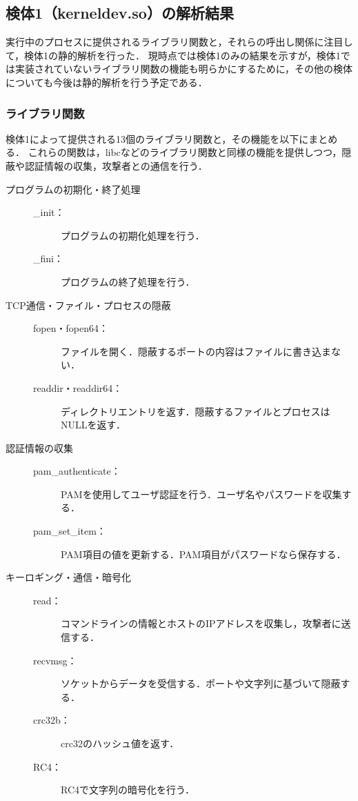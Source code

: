 \documentclass[submit,techreq,noauthor]{eco}	%
\begin{document}
\subsection{検体1（kerneldev.so）の解析結果}
実行中のプロセスに提供されるライブラリ関数と，それらの呼出し関係に注目して，検体1の静的解析を行った．
現時点では検体1のみの結果を示すが，検体1では実装されていないライブラリ関数の機能も明らかにするために，その他の検体についても今後は静的解析を行う予定である．\\
\subsubsection{ライブラリ関数}
検体1によって提供される13個のライブラリ関数と，その機能を以下にまとめる．
これらの関数は，libcなどのライブラリ関数と同様の機能を提供しつつ，隠蔽や認証情報の収集，攻撃者との通信を行う．
\begin{description}

  \item [プログラムの初期化・終了処理] \mbox{}
  \begin{description}
    \item[\_init：] プログラムの初期化処理を行う．
    \item[\_fini：]プログラムの終了処理を行う．
  \end{description}

  \item [TCP通信・ファイル・プロセスの隠蔽] \mbox{}
  \begin{description}
    \item[fopen・fopen64：] ファイルを開く．隠蔽するポートの内容はファイルに書き込まない．
    \item[readdir・readdir64：] ディレクトリエントリを返す．隠蔽するファイルとプロセスはNULLを返す．
  \end{description}

    \item [認証情報の収集] \mbox{}
  \begin{description}
    \item[pam\_authenticate：] PAMを使用してユーザ認証を行う．ユーザ名やパスワードを収集する．
    \item[pam\_set\_item：] PAM項目の値を更新する．PAM項目がパスワードなら保存する．\\
  \end{description}

  \item [キーロギング・通信・暗号化] \mbox{}
  \begin{description}
    \item[read：] コマンドラインの情報とホストのIPアドレスを収集し，攻撃者に送信する．
    \item[recvmsg：]ソケットからデータを受信する．ポートや文字列に基づいて隠蔽する．
    \item[crc32b：] crc32のハッシュ値を返す．
    \item[RC4：] RC4で文字列の暗号化を行う．\\
  \end{description}
\end{description}
\end{document}
